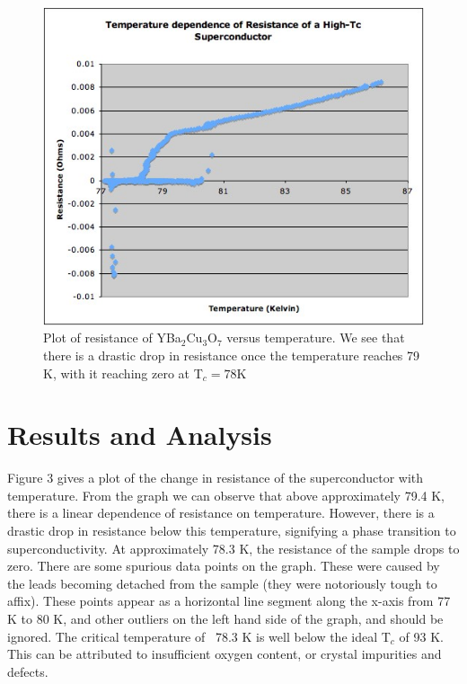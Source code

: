 \documentclass[aps,prl,twocolumn,groupedaddress]{revtex4}
\begin{document}
\begin{figure}[htbp]
\begin{center}
\includegraphics[scale=0.5]{superconductorgraph.jpg}
\caption{Plot of resistance of YBa$_{2}$Cu$_{3}$O$_{7}$ versus temperature. We see that there is a drastic drop in resistance once the temperature reaches 79 K, with it reaching zero at T$_{c}=78$K} 
\label{default}
\end{center}
\end{figure}
\section{Results and Analysis}
Figure 3 gives a plot of the change in resistance of the superconductor with temperature. From the graph we can observe that above approximately 79.4 K, there is a linear dependence of resistance on temperature. However, there is a drastic drop in resistance below this temperature, signifying a phase transition to superconductivity. At approximately 78.3 K, the resistance of the sample drops to zero. There are some spurious data points on the graph. These were caused by the leads becoming detached from the sample (they were notoriously tough to affix). These points appear as a horizontal line segment along the x-axis from 77 K to 80 K, and other outliers on the left hand side of the graph, and should be ignored. The critical temperature of ~78.3 K is well below the ideal T$_{c}$ of 93 K. This can be attributed to insufficient oxygen content\cite{greaves}, or crystal impurities and defects.
\end{document}
